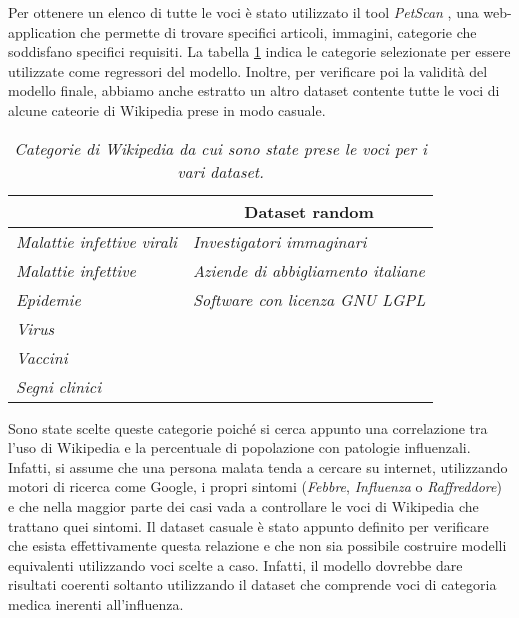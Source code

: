 Per ottenere un elenco di tutte le voci è stato utilizzato il tool \textit{PetScan} \cite{PetScan}, una web-application che 
permette di trovare specifici articoli, immagini, categorie che soddisfano specifici requisiti. La tabella 
\ref{tab:ch_2_wikipedia_cat} indica le categorie selezionate per essere utilizzate come regressori del modello. Inoltre, per 
verificare poi la validità del modello finale, abbiamo anche estratto un altro dataset contente tutte le voci di alcune 
cateorie di Wikipedia prese in modo casuale.
\bigskip

\begin{table}[h]
\centering 
\begin{adjustbox}{max width=\textwidth}
\begin{tabular}{|l|l|}
\hline
\rowcolor[HTML]{EFEFEF} 
\multicolumn{1}{|c|}{\cellcolor[HTML]{EFEFEF}\textbf{Dataset principale}} & \multicolumn{1}{c|}{\cellcolor[HTML]{EFEFEF}\textbf{Dataset random}} \\ \hline
\textit{Malattie infettive virali}                                        & \textit{Investigatori immaginari}                                    \\ \hline
\textit{Malattie infettive}                                               & \textit{Aziende di abbigliamento italiane}                           \\ \hline
\textit{Epidemie}                                                         & \textit{Software con licenza GNU LGPL}                               \\ \hline
\textit{Virus}                                                            & \textit{}                                                            \\ \hline
\textit{Vaccini}                                                          & \textit{}                                                            \\ \hline
\textit{Segni clinici}                                                    & \textit{}                                                            \\ \hline
\end{tabular}
\end{adjustbox}
\caption{\textit{Categorie di Wikipedia da cui sono state prese le voci per i vari dataset.}}
\label{tab:ch_2_wikipedia_cat}
\end{table}

Sono state scelte queste categorie poiché si cerca appunto una correlazione tra l'uso di Wikipedia e la percentuale di 
popolazione con patologie influenzali. Infatti, si assume che una persona malata tenda a cercare su internet, utilizzando 
motori di ricerca come Google, i propri sintomi (\textit{Febbre}, \textit{Influenza} o \textit{Raffreddore}) e che nella 
maggior parte dei casi vada a controllare le voci di Wikipedia che trattano quei sintomi. Il dataset casuale è stato appunto 
definito per verificare che esista effettivamente questa relazione e che non sia possibile costruire modelli equivalenti 
utilizzando voci scelte a caso. Infatti, il modello dovrebbe dare risultati coerenti soltanto utilizzando il dataset che 
comprende voci di categoria medica inerenti all'influenza. 
\bigskip 

